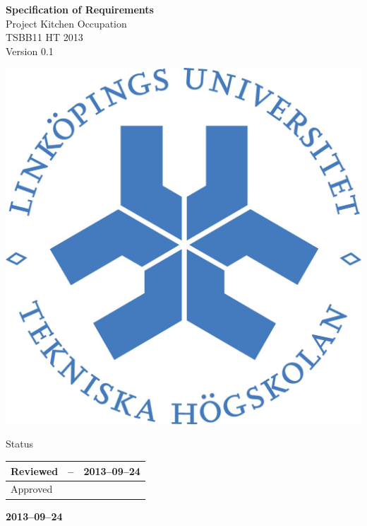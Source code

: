 \documentclass[pdftex, fontsize=11pt, a4paper]{scrbook}
\begin{document}
\begin{titlepage}
\thispagestyle{empty}
\begin{center}
	\vspace*{4\baselineskip}

	\textbf{\huge Specification of Requirements} \\
	\vspace*{0.5\baselineskip}
	{\large  Project Kitchen Occupation} \\
	\vspace*{0.5\baselineskip}
	{\large  TSBB11 HT 2013} \\
	\vspace*{0.5\baselineskip}
	{\large  Version 0.1}


	\vspace*{6\baselineskip}
	\includegraphics[width=0.4\linewidth]{lith_sigill_col}


	\normalfont
	\small
	\vfill


	{\large  Status} \\
	\vspace*{1\baselineskip}
	\begin{tabular}{|p{4cm}|p{4cm}|p{4cm}|}
		\hline
		Reviewed & -- & 2013--09--24 \\
		\hline
		Approved &   &    \\
		\hline
	\end{tabular}


	\vspace*{2\baselineskip}

	\textbf{2013--09--24} \\
	[2\baselineskip]
\end{center}

\end{titlepage}
\end{document}
